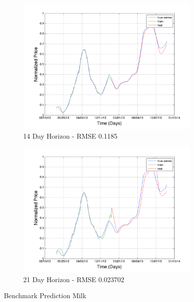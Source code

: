 \begin{figure}
       \hfill
       
        \begin{subfigure}[b]{0.5\textwidth}
                \includegraphics[width=\textwidth]{img/model/milk/model1/pred_14}
                \caption{14 Day Horizon - RMSE 0.1185}
                \label{fig:mouse}
        \end{subfigure}%
         \begin{subfigure}[b]{0.5\textwidth}
                \includegraphics[width=\textwidth]{img/model/milk/model1/pred_21}
                \caption{21 Day Horizon - RMSE 0.023702}
                \label{fig:long_milk_price}
        \end{subfigure}
        \caption{Benchmark Prediction Milk}
        \label{fig:milk_1}
\end{figure}







